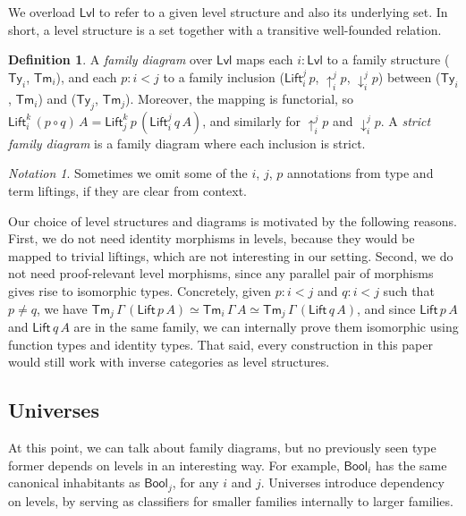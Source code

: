 \documentclass[a4paper,UKenglish,cleveref, autoref, thm-restate]{lipics-v2021}
\theoremstyle{remark}
\newtheorem{notation}{Notation}
\theoremstyle{definition}
\newtheorem{mydefinition}{Definition}
\newcommand{\Ty}{\mathsf{Ty}}
\newcommand{\Tm}{\mathsf{Tm}}
\newcommand{\Bool}{\mathsf{Bool}}
\newcommand{\up}{\uparrow}
\newcommand{\down}{\downarrow}
\newcommand{\Lift}{\mathsf{Lift}}
\newcommand{\Lvl}{\mathsf{Lvl}}
\begin{document}
\noindent We overload $\Lvl$ to refer to a given level structure and also its
underlying set. In short, a level structure is a set together with a transitive
well-founded relation.

\begin{mydefinition}
A \emph{family diagram} over $\Lvl$ maps each $i : \Lvl$ to a family structure
($\Ty_i$, $\Tm_i$), and each $p : i < j$ to a family inclusion
($\Lift_{i}^{j}\,p$, $\up_{i}^{j}p$, $\down_{i}^{j}p$) between ($\Ty_i$,
$\Tm_i$) and ($\Ty_j$, $\Tm_j$). Moreover, the mapping is functorial, so
$\Lift_{i}^{k}\,(p\circ q)\,A = \Lift_{j}^{k}\,p\,(\Lift_{i}^{j}\,q\,A)$, and
similarly for $\up_{i}^{j}p$ and $\down_{i}^{j}p$. A \emph{strict family diagram}
is a family diagram where each inclusion is strict.
\end{mydefinition}

\begin{notation}
Sometimes we omit some of the $i$, $j$, $p$ annotations from type and term
liftings, if they are clear from context.
\end{notation}

Our choice of level structures and diagrams is motivated by the following
reasons. First, we do not need identity morphisms in levels, because they would
be mapped to trivial liftings, which are not interesting in our setting. Second,
we do not need proof-relevant level morphisms, since any parallel pair of
morphisms gives rise to isomorphic types. Concretely, given $p : i < j$ and $q :
i < j$ such that $p \neq q$, we have $\Tm_j\,\Gamma\,(\Lift\,p\,A) \simeq
\Tm_i\,\Gamma\,A \simeq \Tm_j\,\Gamma\,(\Lift\,q\,A)$, and since $\Lift\,p\,A$
and $\Lift\,q\,A$ are in the same family, we can internally prove them
isomorphic using function types and identity types. That said, every
construction in this paper would still work with inverse categories as level
structures.

\subsection{Universes}
\label{sec:universes}

At this point, we can talk about family diagrams, but no previously seen type
former depends on levels in an interesting way. For example, $\Bool_i$ has the
same canonical inhabitants as $\Bool_j$, for any $i$ and $j$. Universes
introduce dependency on levels, by serving as classifiers for smaller families
internally to larger families.
\end{document}

